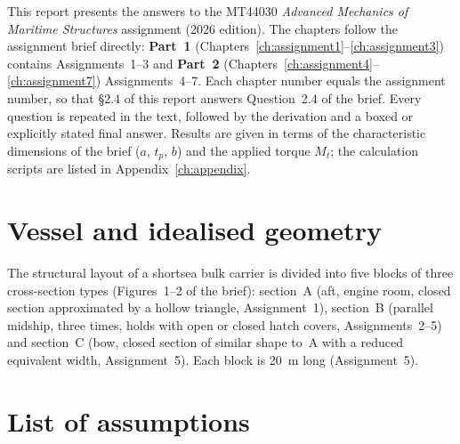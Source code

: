 \label{ch:introduction}

This report presents the answers to the MT44030 \emph{Advanced Mechanics of Maritime Structures} assignment (2026 edition). The chapters follow the assignment brief directly: \textbf{Part~1} (Chapters~\ref{ch:assignment1}--\ref{ch:assignment3}) contains Assignments~1--3 and \textbf{Part~2} (Chapters~\ref{ch:assignment4}--\ref{ch:assignment7}) Assignments~4--7. Each chapter number equals the assignment number, so that \S2.4 of this report answers Question~2.4 of the brief. Every question is repeated in the text, followed by the derivation and a boxed or explicitly stated final answer. Results are given in terms of the characteristic dimensions of the brief ($a$, $t_p$, $b$) and the applied torque $M_t$; the calculation scripts are listed in Appendix~\ref{ch:appendix}.

\section{Vessel and idealised geometry}

The structural layout of a shortsea bulk carrier is divided into five blocks of three cross-section types (Figures~1--2 of the brief): section~A (aft, engine room, closed section approximated by a hollow triangle, Assignment~1), section~B (parallel midship, three times, holds with open or closed hatch covers, Assignments~2--5) and section~C (bow, closed section of similar shape to~A with a reduced equivalent width, Assignment~5). Each block is 20~m long (Assignment~5).

\section{List of assumptions}
\label{sec:assumptions}

